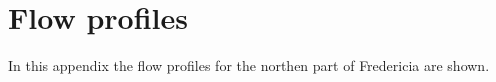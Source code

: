 \newpage
\section{Flow profiles}\label{app:flow_profiles}
In this appendix the flow profiles for the northen part of Fredericia are shown. 



